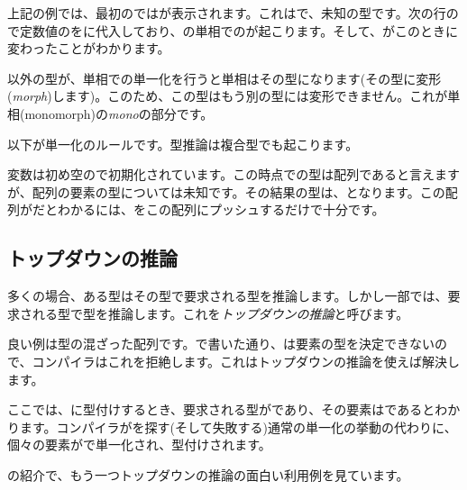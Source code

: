 上記の例では、最初のではが表示されます。これはで、未知の型です。次の行ので定数値のをに代入しており、の単相でのが起こります。そして、がこのときに変わったことがわかります。

以外の型が、単相での単一化を行うと単相はその型になります(その型に変形(\emph{morph})します)。このため、この型はもう別の型には変形できません。これが単相(monomorph)の\emph{mono}の部分です。

以下が単一化のルールです。型推論は複合型でも起こります。


変数は初め空ので初期化されています。この時点での型は配列であると言えますが、配列の要素の型については未知です。その結果の型は、となります。この配列がだとわかるには、をこの配列にプッシュするだけで十分です。

\subsection{トップダウンの推論}
\label{type-system-top-down-inference}

多くの場合、ある型はその型で要求される型を推論します。しかし一部では、要求される型で型を推論します。これを\emph{トップダウンの推論}と呼びます。


良い例は型の混ざった配列です。で書いた通り、\expr{[1, "foo"]}は要素の型を決定できないので、コンパイラはこれを拒絶します。これはトップダウンの推論を使えば解決します。


ここでは、\expr{[1, "foo"]}に型付けするとき、要求される型がであり、その要素はであるとわかります。コンパイラがを探す(そして失敗する)通常の単一化の挙動の代わりに、個々の要素がで単一化され、型付けされます。

の紹介で、もう一つトップダウンの推論の面白い利用例を見ています。

